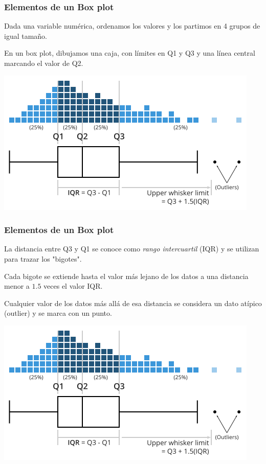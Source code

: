 \documentclass[aspectratio=169,12pt]{beamer}
\begin{document}
\begin{frame}
\frametitle{Elementos de un Box plot}

Dada una variable numérica, ordenamos los valores y los partimos en 4 grupos de igual tamaño.

En un box plot, dibujamos una caja, con límites en Q1 y Q3 y una línea central marcando el valor de Q2.

\begin{center}
\includegraphics[scale=.45]{clase4-box-plot-construction.png}
\end{center}

\end{frame}


\begin{frame}
\frametitle{Elementos de un Box plot}

La distancia entre Q3 y Q1 se conoce como \emph{rango intercuartil} (IQR) y se utilizan para trazar los "bigotes".

Cada bigote se extiende hasta el valor más lejano de los datos a una distancia menor a $1.5$ veces el valor IQR.

Cualquier valor de los datos más allá de esa distancia se considera un dato atípico (outlier) y se marca con un punto.

\begin{center}
\includegraphics[scale=.35]{clase4-box-plot-construction.png}
\end{center}

\end{frame}
\end{document}
